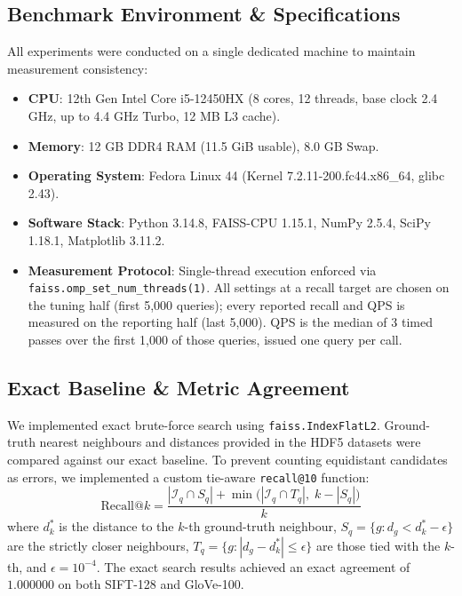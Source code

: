\documentclass[10pt,twocolumn,a4paper]{article}
\begin{document}
\subsection{Benchmark Environment \& Specifications}
All experiments were conducted on a single dedicated machine to maintain measurement consistency:
\begin{itemize}
    \item \textbf{CPU}: 12th Gen Intel Core i5-12450HX (8 cores, 12 threads, base clock 2.4 GHz, up to 4.4 GHz Turbo, 12 MB L3 cache).
    \item \textbf{Memory}: 12 GB DDR4 RAM (11.5 GiB usable), 8.0 GB Swap.
    \item \textbf{Operating System}: Fedora Linux 44 (Kernel 7.2.11-200.fc44.x86\_64, glibc 2.43).
    \item \textbf{Software Stack}: Python 3.14.8, FAISS-CPU 1.15.1, NumPy 2.5.4, SciPy 1.18.1, Matplotlib 3.11.2.
    \item \textbf{Measurement Protocol}: Single-thread execution enforced via \texttt{faiss.omp\_set\_num\_threads(1)}. All settings at a recall target are chosen on the tuning half (first 5,000 queries); every reported recall and QPS is measured on the reporting half (last 5,000). QPS is the median of 3 timed passes over the first 1,000 of those queries, issued one query per call.
\end{itemize}

\subsection{Exact Baseline \& Metric Agreement}
We implemented exact brute-force search using \texttt{faiss.IndexFlatL2}. Ground-truth nearest neighbours and distances provided in the HDF5 datasets were compared against our exact baseline. To prevent counting equidistant candidates as errors, we implemented a custom tie-aware \texttt{recall@10} function:
\begin{equation}
\text{Recall@}k = \frac{|\mathcal{I}_q \cap S_q| + \min\big(|\mathcal{I}_q \cap T_q|,\; k - |S_q|\big)}{k}
\end{equation}
where $d_k^*$ is the distance to the $k$-th ground-truth neighbour, $S_q = \{g : d_g < d_k^* - \epsilon\}$ are the strictly closer neighbours, $T_q = \{g : |d_g - d_k^*| \le \epsilon\}$ are those tied with the $k$-th, and $\epsilon = 10^{-4}$. The exact search results achieved an exact agreement of $1.000000$ on both SIFT-128 and GloVe-100.
\end{document}
